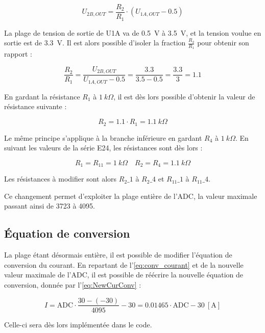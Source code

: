 \begin{equation}
    U_{2B,OUT} = \frac{R_2}{R_1}\cdot(U_{1A,OUT} - 0.5)
\end{equation}

La plage de tension de sortie de U1A va de 0.5~V à 3.5~V, et la tension voulue en sortie est de 3.3~V. Il est alors possible d'isoler la fraction $\frac{R_2}{R_1}$ pour obtenir son rapport :

\begin{equation}
    \frac{R_2}{R_1} = \frac{U_{2B,OUT}}{U_{1A,OUT} - 0.5}
    = \frac{3.3}{3.5 - 0.5} = \frac{3.3}{3} = 1.1
\end{equation}

En gardant la résistance $R_1$ à $1~k\Omega$, il est dès lors possible d'obtenir la valeur de résistance suivante :

\begin{equation}
    R_2 = 1.1\cdot R_1 = 1.1~k\Omega
\end{equation}

Le même principe s'applique à la branche inférieure en gardant $R_4$ à $1~k\Omega$. En suivant les valeurs de la série E24, les résistances sont dès lors :

\begin{equation}
    R_1 = R_{11} = 1~k\Omega
    \quad
    R_2 = R_4 = 1.1~k\Omega
\end{equation}

Les résistances à modifier sont alors $R_2\_1$ à $R_2\_4$ et $R_{11}\_1$ à $R_{11}\_4$.

Ce changement permet d'exploiter la plage entière de l'ADC, la valeur maximale passant ainsi de 3723 à 4095.

\subsection{Équation de conversion}
La plage étant désormais entière, il est possible de modifier l'équation de conversion du courant. En repartant de l'\autoref{eq:conv_courant} et de la nouvelle valeur maximale de l'ADC, il est possible de réécrire la nouvelle équation de conversion, donnée par l'\autoref{eq:NewCurConv} :

\begin{equation}
    I = \text{ADC} \cdot \frac{30 - (-30)}{4095} - 30 = 0.01465 \cdot \text{ADC} - 30~[\text{A}]
    \label{eq:NewCurConv}
\end{equation}

Celle-ci sera dès lors implémentée dans le code.

